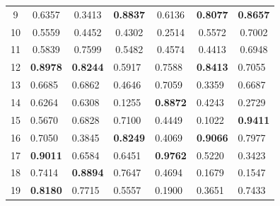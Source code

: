 \documentclass[runningheads]{llncs}
\begin{document}
\begin{table}
\begin{center}
\begin{tabular}{|c|c|c|c|c|c|c|}
9      & 0.6357                               & 0.3413                               & \textbf{0.8837}                      & 0.6136                               & \textbf{0.8077}                      & \textbf{0.8657}                      \\
10     & 0.5559                               & 0.4452                               & 0.4302                               & 0.2514                               & 0.5572                               & 0.7002                               \\
11     & 0.5839                               & 0.7599                               & 0.5482                               & 0.4574                               & 0.4413                               & 0.6948                               \\
12     & \multicolumn{1}{l|}{\textbf{0.8978}} & \multicolumn{1}{l|}{\textbf{0.8244}} & \multicolumn{1}{l|}{0.5917}          & \multicolumn{1}{l|}{0.7588}          & \multicolumn{1}{l|}{\textbf{0.8413}} & \multicolumn{1}{l|}{0.7055}          \\
13     & \multicolumn{1}{l|}{0.6685}          & \multicolumn{1}{l|}{0.6862}          & \multicolumn{1}{l|}{0.4646}          & \multicolumn{1}{l|}{0.7059}          & \multicolumn{1}{l|}{0.3359}          & \multicolumn{1}{l|}{0.6687}          \\
14     & \multicolumn{1}{l|}{0.6264}          & \multicolumn{1}{l|}{0.6308}          & \multicolumn{1}{l|}{0.1255}          & \multicolumn{1}{l|}{\textbf{0.8872}} & \multicolumn{1}{l|}{0.4243}          & \multicolumn{1}{l|}{0.2729}          \\
15     & \multicolumn{1}{l|}{0.5670}          & \multicolumn{1}{l|}{0.6828}          & \multicolumn{1}{l|}{0.7100}          & \multicolumn{1}{l|}{0.4449}          & \multicolumn{1}{l|}{0.1022}          & \multicolumn{1}{l|}{\textbf{0.9411}} \\
16     & \multicolumn{1}{l|}{0.7050}          & \multicolumn{1}{l|}{0.3845}          & \multicolumn{1}{l|}{\textbf{0.8249}} & \multicolumn{1}{l|}{0.4069}          & \multicolumn{1}{l|}{\textbf{0.9066}} & \multicolumn{1}{l|}{0.7977}          \\
17     & \multicolumn{1}{l|}{\textbf{0.9011}} & \multicolumn{1}{l|}{0.6584}          & \multicolumn{1}{l|}{0.6451}          & \multicolumn{1}{l|}{\textbf{0.9762}} & \multicolumn{1}{l|}{0.5220}          & \multicolumn{1}{l|}{0.3423}          \\
18     & \multicolumn{1}{l|}{0.7414}          & \multicolumn{1}{l|}{\textbf{0.8894}} & \multicolumn{1}{l|}{0.7647}          & \multicolumn{1}{l|}{0.4694}          & \multicolumn{1}{l|}{0.1679}          & \multicolumn{1}{l|}{0.1547}          \\
19     & \multicolumn{1}{l|}{\textbf{0.8180}} & \multicolumn{1}{l|}{0.7715}          & \multicolumn{1}{l|}{0.5557}          & \multicolumn{1}{l|}{0.1900}          & \multicolumn{1}{l|}{0.3651}          & \multicolumn{1}{l|}{0.7433}         
\end{tabular}
\end{center}
\end{table}
\end{document}
